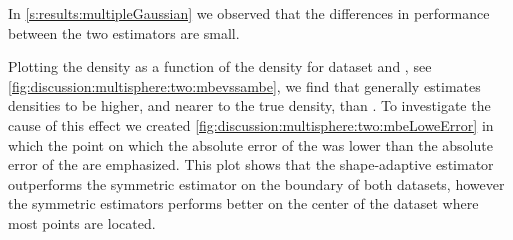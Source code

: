 
	In \cref{s:results:multipleGaussian} we observed that the differences in performance between the two estimators are small. 

	Plotting the \mbe density as a function of the \sambe density for dataset \ferdosiTwo and \baakmanTwo, see \cref{fig:discussion:multisphere:two:mbevssambe}, we find that \sambe generally estimates densities to be higher, and nearer to the true density, than \mbe. To investigate the cause of this effect we created \cref{fig:discussion:multisphere:two:mbeLoweError} in which the point on which the absolute error of the \mbe was lower than the absolute error of the \sambe are emphasized. This plot shows that the shape-adaptive estimator outperforms the symmetric estimator on the boundary of both datasets, however the symmetric estimators performs better on the center of the dataset where most points are located. 

